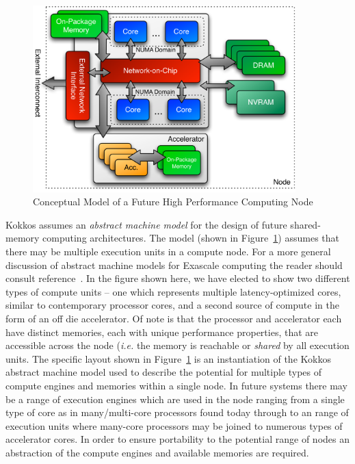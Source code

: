 \begin{figure}
\begin{center}
\includegraphics[width=4in]{figures/kokkos-node.pdf}
\caption{Conceptual Model of a Future High Performance Computing Node}
\label{fig:kokkosnode}
\end{center}
\end{figure}

Kokkos assumes an {\em abstract machine model} for the design of
future shared-memory computing architectures. The model (shown in
Figure~\ref{fig:kokkosnode}) assumes that there may be multiple
execution units in a compute node. For a more general discussion
of abstract machine models for Exascale computing the reader should
consult reference~\cite{cal_amm}. In the figure shown here,
we have elected to
show two different types of compute units -- one which represents
multiple latency-optimized cores, similar to contemporary processor
cores, and a second source of compute in the form of an off die
accelerator. Of note is that the processor and accelerator each 
have distinct memories, each with unique performance properties,
that are accessible across the node ({\em i.e.} the memory is
reachable or {\em shared} by all execution units. The specific
layout shown in Figure~\ref{fig:kokkosnode} is an instantiation
of the Kokkos abstract machine model used to describe the potential
for multiple types of compute engines and memories within a single
node. In future systems there may be a range of execution engines
which are used in the node ranging from a single type of core
as in many/multi-core processors found today through to an range
of execution units where many-core processors may be joined to
numerous types of accelerator cores. In order to ensure portability
to the potential range of nodes an abstraction of the
compute engines and available memories are required.

